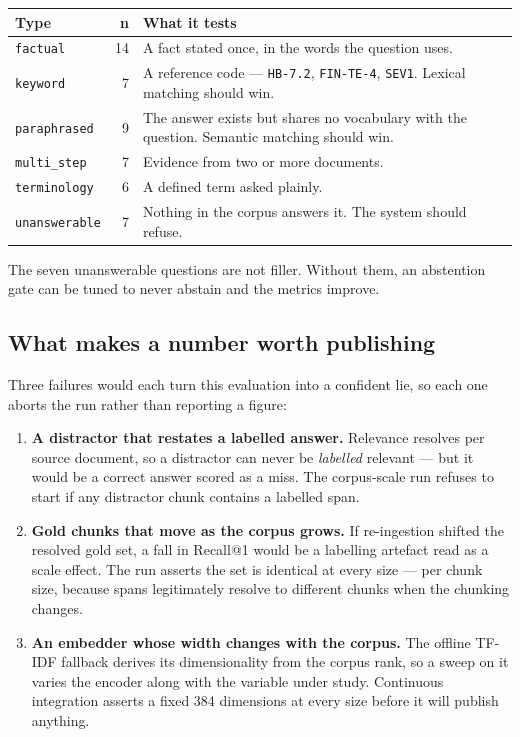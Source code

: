 \documentclass[11pt,a4paper]{article}
\newcommand{\code}[1]{\texttt{\small #1}}
\begin{document}
\begin{center}
\small
\begin{tabular}{@{}lrp{8.6cm}@{}}
\toprule
\textbf{Type} & \textbf{n} & \textbf{What it tests} \\
\midrule
\code{factual}      & 14 & A fact stated once, in the words the question uses. \\
\code{keyword}      &  7 & A reference code --- \code{HB-7.2}, \code{FIN-TE-4}, \code{SEV1}. Lexical matching should win. \\
\code{paraphrased}  &  9 & The answer exists but shares no vocabulary with the question. Semantic matching should win. \\
\code{multi\_step}  &  7 & Evidence from two or more documents. \\
\code{terminology}  &  6 & A defined term asked plainly. \\
\code{unanswerable} &  7 & Nothing in the corpus answers it. The system should refuse. \\
\bottomrule
\end{tabular}
\end{center}

The seven unanswerable questions are not filler. Without them, an abstention gate
can be tuned to never abstain and the metrics improve.

\subsection{What makes a number worth publishing}

Three failures would each turn this evaluation into a confident lie, so each one
aborts the run rather than reporting a figure:

\begin{enumerate}[leftmargin=1.4em,itemsep=3pt]
  \item \textbf{A distractor that restates a labelled answer.} Relevance resolves
        per source document, so a distractor can never be \emph{labelled}
        relevant --- but it would be a correct answer scored as a miss. The
        corpus-scale run refuses to start if any distractor chunk contains a
        labelled span.
  \item \textbf{Gold chunks that move as the corpus grows.} If re-ingestion
        shifted the resolved gold set, a fall in Recall@1 would be a labelling
        artefact read as a scale effect. The run asserts the set is identical at
        every size --- per chunk size, because spans legitimately resolve to
        different chunks when the chunking changes.
  \item \textbf{An embedder whose width changes with the corpus.} The offline
        TF-IDF fallback derives its dimensionality from the corpus rank, so a
        sweep on it varies the encoder along with the variable under study.
        Continuous integration asserts a fixed 384 dimensions at every size
        before it will publish anything.
\end{enumerate}
\end{document}

